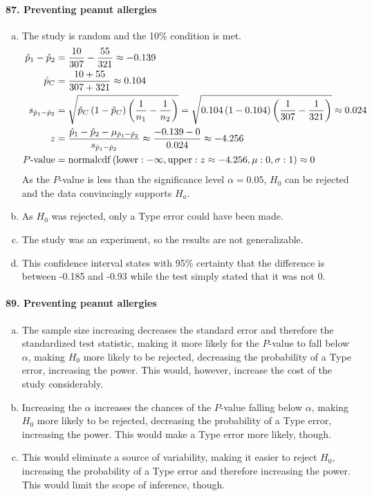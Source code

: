 			\paragraph{87. Preventing peanut allergies}
				\begin{enumerate}[a.]
					\item
						The study is random and the 10\% condition is met.
						\begin{align*}
							\hat{p}_1 - \hat{p}_2 &= \frac{10}{307} - \frac{55}{321} \approx -0.139 \\
							\hat{p}_C &= \frac{10 + 55}{307 + 321} \approx  0.104 \\
							s_{\hat{p}_1 - \hat{p}_2} &= \sqrt{\hat{p}_C\left(1 - \hat{p}_C\right)\left(\frac{1}{n_1} - \frac{1}{n_2}\right)} = \sqrt{0.104\left(1 - 0.104\right)\left(\frac{1}{307} - \frac{1}{321}\right)} \approx 0.024 \\
							z &= \frac{\hat{p}_1 - \hat{p}_2 - \mu_{\hat{p}_1 - \hat{p}_2}}{s_{\hat{p}_1 - \hat{p}_2}} \approx \frac{-0.139 - 0}{0.024} \approx -4.256 \\
							P\text{-value} &= \operatorname{normalcdf}\left(\operatorname{lower}: -\infty, \operatorname{upper}: z \approx -4.256, \mu: 0, \sigma: 1\right) \approx 0
						\end{align*}
						As the $P$-value is less than the significance level $\alpha = 0.05$, $H_0$ can be rejected and the data convincingly supports $H_a$.
					\item
						As $H_0$ was rejected, only a Type  error could have been made.
					\item
						The study was an experiment, so the results are not generalizable.
					\item
						This confidence interval states with 95\% certainty that the difference is between -0.185 and -0.93 while the test simply stated that it was not 0.
				\end{enumerate}
			\paragraph{89. Preventing peanut allergies}
				\begin{enumerate}[a.]
					\item
						The sample size increasing decreases the standard error and therefore the standardized test statistic, making it more likely for the $P$-value to fall below $\alpha$, making $H_0$ more likely to be rejected, decreasing the probability of a Type  error, increasing the power. This would, however, increase the cost of the study considerably.
					\item
						Increasing the $\alpha$ increases the chances of the $P$-value falling below $\alpha$, making $H_0$ more likely to be rejected, decreasing the probability of a Type  error, increasing the power. This would make a Type  error more likely, though.
					\item
						This would eliminate a source of variability, making it easier to reject $H_0$, increasing the probability of a Type  error and therefore increasing the power. This would limit the scope of inference, though.
				\end{enumerate}
